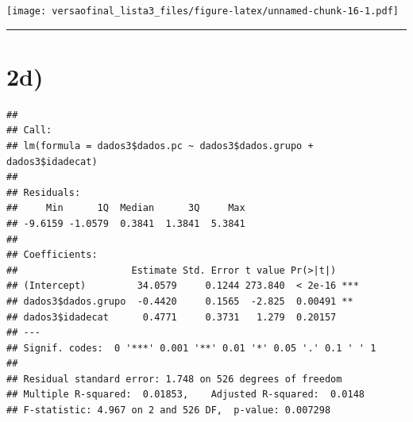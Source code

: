 \documentclass[11pt,]{article}
\newenvironment{Shaded}{\begin{snugshade}}{\end{snugshade}}
\newcommand{\KeywordTok}[1]{\textcolor[rgb]{0.13,0.29,0.53}{\textbf{{#1}}}}
\newcommand{\DataTypeTok}[1]{\textcolor[rgb]{0.13,0.29,0.53}{{#1}}}
\newcommand{\DecValTok}[1]{\textcolor[rgb]{0.00,0.00,0.81}{{#1}}}
\newcommand{\StringTok}[1]{\textcolor[rgb]{0.31,0.60,0.02}{{#1}}}
\newcommand{\CommentTok}[1]{\textcolor[rgb]{0.56,0.35,0.01}{\textit{{#1}}}}
\newcommand{\NormalTok}[1]{{#1}}
\begin{document}
\texttt{[image: versaofinal\_lista3\_files/figure-latex/unnamed-chunk-16-1.pdf]}

\begin{center}\rule{0.5\linewidth}{\linethickness}\end{center}

\section{2d)}\label{d-1}

\begin{Shaded}
\end{Shaded}

\begin{Shaded}
\end{Shaded}

\begin{verbatim}
## 
## Call:
## lm(formula = dados3$dados.pc ~ dados3$dados.grupo + dados3$idadecat)
## 
## Residuals:
##     Min      1Q  Median      3Q     Max 
## -9.6159 -1.0579  0.3841  1.3841  5.3841 
## 
## Coefficients:
##                    Estimate Std. Error t value Pr(>|t|)    
## (Intercept)         34.0579     0.1244 273.840  < 2e-16 ***
## dados3$dados.grupo  -0.4420     0.1565  -2.825  0.00491 ** 
## dados3$idadecat      0.4771     0.3731   1.279  0.20157    
## ---
## Signif. codes:  0 '***' 0.001 '**' 0.01 '*' 0.05 '.' 0.1 ' ' 1
## 
## Residual standard error: 1.748 on 526 degrees of freedom
## Multiple R-squared:  0.01853,    Adjusted R-squared:  0.0148 
## F-statistic: 4.967 on 2 and 526 DF,  p-value: 0.007298
\end{verbatim}
\end{document}
